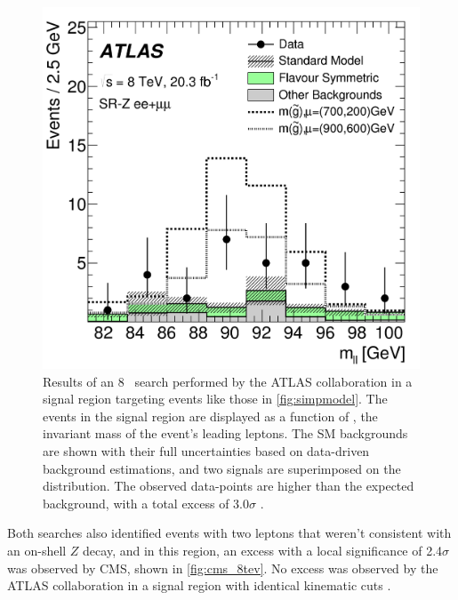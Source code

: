 \begin{centering}
\begin{figure}[!hbt]
\myfloatalign
\includegraphics[width=.9\linewidth]{figures/theory/figaux_12a.png}
\caption{ Results of an 8 \tev~search performed by the \ac{ATLAS} collaboration in a signal region targeting events like those in \autoref{fig:simpmodel}. The events in the signal region are displayed as a function of \mll, the invariant mass of the event's leading leptons. The \ac{SM} backgrounds are shown with their full uncertainties based on data-driven background estimations, and two signals are superimposed on the distribution. The observed data-points are higher than the expected background, with a total excess of 3.0$\sigma$ \cite{SUSY-2014-10}.}
\label{fig:atlas_8tev}
\end{figure}
\end{centering}

Both searches also identified events with two leptons that weren't consistent with an on-shell $Z$ decay, and in this region, an excess with a local significance of 2.4$\sigma$ was observed by \ac{CMS}, shown in \autoref{fig:cms_8tev}. No excess was observed by the \ac{ATLAS} collaboration in a signal region with identical kinematic cuts \cite{SUSY-2014-10}. 

